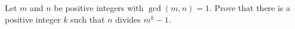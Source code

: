 Let $m$ and $n$ be positive integers with $\gcd(m,n)=1$. Prove that there is a positive integer $k$ such that $n$ divides $m^k-1$.
